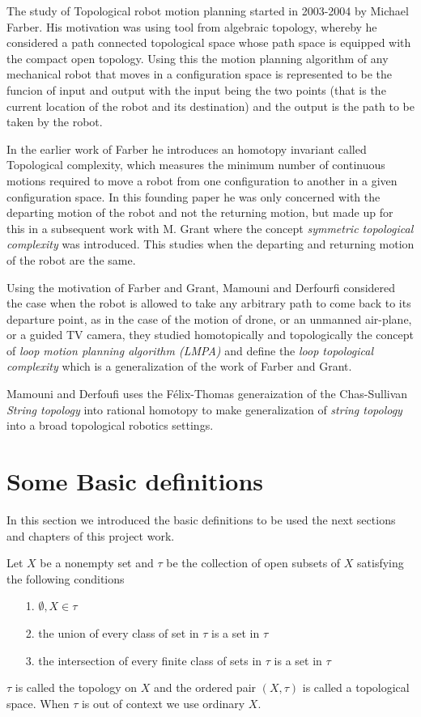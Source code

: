 The study of Topological robot motion planning started in 2003-2004 by Michael Farber. His motivation was using tool from algebraic topology, whereby he considered a path connected topological space whose path space is equipped with the compact open topology. Using this the motion planning algorithm of any mechanical robot that moves in a configuration space is represented to be the funcion of input and output with the input being the two points (that is the current location of the robot and its destination) and the output is the path to be taken by the robot.

In the earlier work of Farber he introduces an homotopy invariant called Topological complexity, which measures the minimum number of continuous motions required to move a robot from one configuration to another in a given configuration space. In this founding paper he was only concerned with the departing motion of the robot and not the returning motion, but made up for this in a subsequent work with M. Grant where the concept \textit{symmetric topological complexity} was introduced. This studies when the departing and returning motion of the robot are the same.

Using the motivation of Farber and Grant, Mamouni and Derfourfi considered the case when the robot is allowed to take any arbitrary path to come back to its departure point, as in the case of the motion of drone, or an unmanned air-plane, or a guided TV camera, they studied homotopically and topologically the concept of \textit{loop motion planning algorithm (LMPA)}  and define the \textit{loop topological complexity} which is a generalization of the work of Farber and Grant.

Mamouni and Derfoufi uses the F\'elix-Thomas generaization of the Chas-Sullivan \textit{String topology} into rational homotopy to make generalization of \textit{string topology} into a broad topological robotics settings.

\section{Some Basic definitions}
In this section we introduced the basic definitions to be used the next sections and chapters of this project work.

\begin{defn}
    Let $X$ be a nonempty set and $\tau$ be the collection of open subsets of $X$ satisfying the following conditions
    \begin{itemize}
        \item[1.] $\emptyset, X \in \tau$
        \item[2.] the union of every class of set in $\tau$ is a set in $\tau$
        \item[3.] the intersection of every finite class of sets in $\tau$ is a set in $\tau$
    \end{itemize}
    $\tau$ is called the topology on $X$ and the ordered pair $(X, \tau)$ is called a topological space. When $\tau$ is out of context we use ordinary $X$.
\end{defn}

